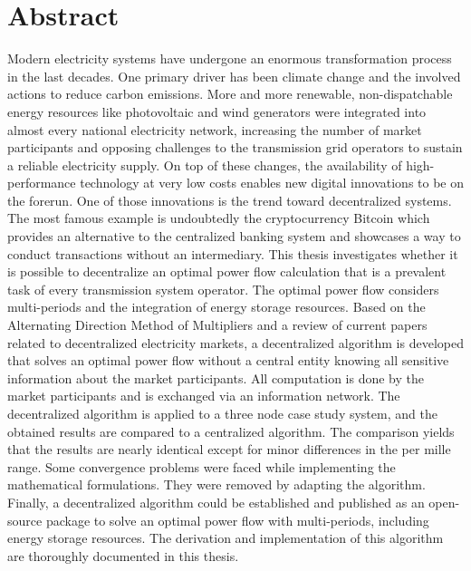 \section*{Abstract}

Modern electricity systems have undergone an enormous transformation process in the last decades. One primary driver has been climate change and the involved actions to reduce carbon emissions. More and more renewable, non-dispatchable energy resources like photovoltaic and wind generators were integrated into almost every national electricity network, increasing the number of market participants and opposing challenges to the transmission grid operators to sustain a reliable electricity supply. On top of these changes, the availability of high-performance technology at very low costs enables new digital innovations to be on the forerun. One of those innovations is the trend toward decentralized systems. The most famous example is undoubtedly the cryptocurrency Bitcoin which provides an alternative to the centralized banking system and showcases a way to conduct transactions without an intermediary. This thesis investigates whether it is possible to decentralize an optimal power flow calculation that is a prevalent task of every transmission system operator. The optimal power flow considers multi-periods and the integration of energy storage resources. Based on the Alternating Direction Method of Multipliers and a review of current papers related to decentralized electricity markets, a decentralized algorithm is developed that solves an optimal power flow without a central entity knowing all sensitive information about the market participants. All computation is done by the market participants and is exchanged via an information network. The decentralized algorithm is applied to a three node case study system, and the obtained results are compared to a centralized algorithm. The comparison yields that the results are nearly identical except for minor differences in the per mille range. Some convergence problems were faced while implementing the mathematical formulations. They were removed by adapting the algorithm. Finally, a decentralized algorithm could be established and published as an open-source package to solve an optimal power flow with multi-periods, including energy storage resources. The derivation and implementation of this algorithm are thoroughly documented in this thesis.